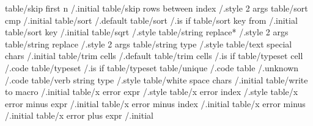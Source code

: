 table/skip first n                                                              /.initial     
table/skip rows between index                                                   /.style 2 args
table/sort cmp                                                                  /.initial     
table/sort                                                                      /.default     
table/sort                                                                      /.is if       
table/sort key from                                                             /.initial     
table/sort key                                                                  /.initial     
table/sqrt                                                                      /.style       
table/string replace*                                                           /.style 2 args
table/string replace                                                            /.style 2 args
table/string type                                                               /.style       
table/text special chars                                                        /.initial     
table/trim cells                                                                /.default     
table/trim cells                                                                /.is if       
table/typeset cell                                                              /.code        
table/typeset                                                                   /.is if       
table/typeset                      
table/unique                                                                    /.code        
table                                                                           /.unknown     /.code
table/verb string type                                                          /.style       
table/white space chars                                                         /.initial     
table/write to macro                                                            /.initial     
table/x error expr                                                              /.style       
table/x error index                                                             /.style       
table/x error minus expr                                                        /.initial     
table/x error minus index                                                       /.initial     
table/x error minus                                                             /.initial     
table/x error plus expr                                                         /.initial     

